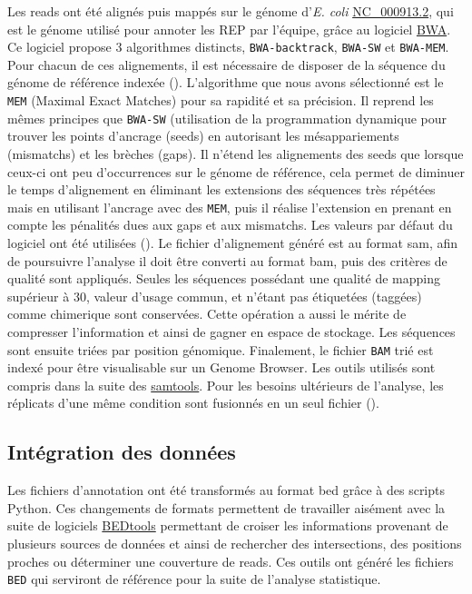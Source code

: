 \documentclass[12pt,a4paper]{report}
\begin{document}
\begin{onehalfspace}
Les reads ont été alignés puis mappés sur le génome d'\textit{E. coli} \href{http://www.ncbi.nlm.nih.gov/nuccore/NC_000913.2}{NC\_000913.2}, qui est le génome utilisé pour annoter les REP par l'équipe, grâce au logiciel \href{http://bio-bwa.sourceforge.net/}{BWA}.  Ce logiciel propose 3 algorithmes distincts, \texttt{BWA-backtrack}, \texttt{BWA-SW} et \texttt{BWA-MEM}. Pour chacun de ces alignements, il est nécessaire de disposer de la séquence du génome de référence indexée (). 
L'algorithme que nous avons sélectionné est le \texttt{MEM} (Maximal Exact Matches) pour sa rapidité et sa précision. Il reprend les mêmes principes que \texttt{BWA-SW} (utilisation de la programmation dynamique pour trouver les points d'ancrage (seeds) en autorisant les mésappariements (mismatchs) et les brèches (gaps). Il n'étend les alignements des seeds que lorsque ceux-ci ont peu d'occurrences sur le génome de référence, cela permet de diminuer le temps d'alignement en éliminant les extensions des séquences très répétées mais en utilisant l'ancrage avec des \texttt{MEM}, puis il réalise l'extension en prenant en compte les pénalités dues aux gaps et aux mismatchs. Les valeurs par défaut du logiciel ont été utilisées ().
Le fichier d'alignement généré est au format \gls{sam}, afin de poursuivre l'analyse il doit être converti au format \gls{bam}, puis des critères de qualité sont appliqués. Seules les séquences possédant une qualité de mapping supérieur à 30, valeur d'usage commun, et n'étant pas étiquetées (taggées) comme \gls{chimerique} sont conservées. Cette opération a aussi le mérite de compresser l'information et ainsi de gagner en espace de stockage. Les séquences sont ensuite triées par position génomique. Finalement, le fichier \texttt{BAM} trié est indexé pour être visualisable sur un Genome Browser. Les outils utilisés sont compris dans la suite des \href{http://samtools.sourceforge.net/samtools.shtml}{samtools}. Pour les besoins ultérieurs de l'analyse, les réplicats d'une même condition sont fusionnés en un seul fichier ().

\subsection*{Intégration des données}

Les fichiers d'annotation ont été transformés au format \gls{bed} grâce à des scripts Python.
Ces changements de formats permettent de travailler aisément avec la suite de logiciels \href{http://bedtools.readthedocs.org/en/latest/}{BEDtools} permettant de croiser les informations provenant de plusieurs sources de données et ainsi de rechercher des intersections, des positions proches ou déterminer une \gls{couverture} de reads. Ces outils ont généré les fichiers \texttt{BED} qui serviront de référence pour la suite de l'analyse statistique.


\end{onehalfspace}
\end{document}
